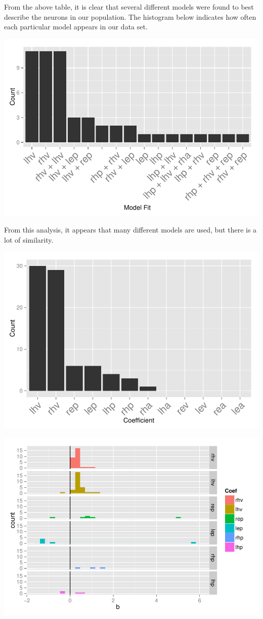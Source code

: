 \documentclass[]{article}
\begin{document}
From the above table, it is clear that several different models were
found to best describe the neurons in our population. The histogram
below indicates how often each particular model appears in our data set.

\includegraphics{NRGRecord_files/figure-latex/modelcount-1.pdf}

From this analysis, it appears that many different models are used, but
there is a lot of similarity.

\includegraphics{NRGRecord_files/figure-latex/coefCounts-1.pdf}

\includegraphics{NRGRecord_files/figure-latex/hvCoefs-1.pdf}
\end{document}
